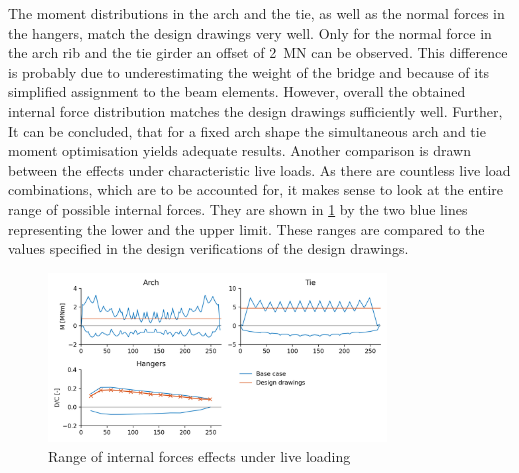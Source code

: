 The moment distributions in the arch and the tie, as well as the normal forces in the hangers, match the design drawings very well. Only for the normal force in the arch rib and the tie girder an offset of \SI{2}{MN} can be observed. This difference is probably due to underestimating the weight of the bridge and because of its simplified assignment to the beam elements. However, overall the obtained internal force distribution matches the design drawings sufficiently well. Further, It can be concluded, that for a fixed arch shape the simultaneous arch and tie moment optimisation yields adequate results. Another comparison is drawn between the effects under characteristic live loads. As there are countless live load combinations, which are to be accounted for, it makes sense to look at the entire range of possible internal forces. They are shown in \cref{fig:base_case_live} by the two blue lines representing the lower and the upper limit. These ranges are compared to the values specified in the design verifications of the design drawings.

\begin{figure}[H]
    \centering
    \includegraphics[width=0.8\textwidth]{calculations/Base case/Live load.png}
    \caption{Range of internal forces effects under live loading}
    \label{fig:base_case_live}
\end{figure}

